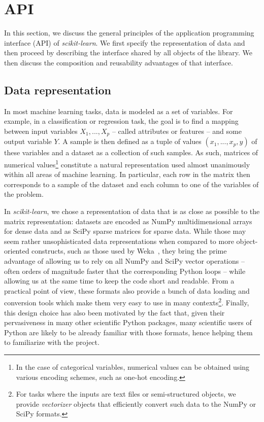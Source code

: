 \documentclass{llncs}
\begin{document}

\section{API}

\label{sec:api}

In this section, we discuss the general principles of the application
programming interface (API) of \textit{scikit-learn}. We first specify the
representation of data and then proceed by describing the interface shared by
all objects of the library. We then discuss the composition and reusability
advantages of that interface.

\subsection{Data representation}

In most machine learning tasks, data is modeled as a set of variables.  For
example, in a classification or regression task, the goal is to find a mapping
between input variables $X_1, ..., X_p$ -- called attributes or features -- and
some output variable $Y$. A sample is then defined as a tuple of values $(x_1,
..., x_p, y)$ of these variables and a dataset as a collection of such samples.
As such, matrices of numerical values\footnote{In the case of categorical
variables, numerical values can be obtained using various encoding schemes, such
as one-hot encoding.} constitute a natural representation used almost
unanimously within all areas of machine learning. In particular, each row in the
matrix then corresponds to a sample of the dataset and each column to one of the
variables of the problem.

In \textit{scikit-learn}, we chose a representation of data that is as close as
possible to the matrix representation: datasets are encoded as NumPy
multidimensional arrays for dense data and as SciPy sparse matrices for sparse
data. While those may seem rather unsophisticated data representations
when compared to more object-oriented
constructs, such as those used by Weka~\citep{hall2009weka},
they bring the prime advantage
of allowing us to rely on all NumPy and SciPy vector operations -- often orders
of magnitude faster that the corresponding Python loops -- while allowing us at
the same time to keep the code short and readable. From a practical point of
view, these formats also provide a bunch of data loading and conversion tools
which make them very easy to use in many contexts\footnote{For tasks where the
inputs are text files or semi-structured objects, we provide \textit{vectorizer}
objects that efficiently convert such data to the NumPy or SciPy formats.}.
Finally, this design choice has also been motivated by the fact that, given
their pervasiveness in many other scientific Python packages, many scientific
users of Python are likely to be already familiar with those formats, hence helping
them to familiarize with the project.
\end{document}
